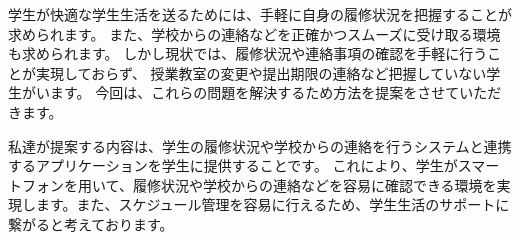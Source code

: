 学生が快適な学生生活を送るためには、手軽に自身の履修状況を把握することが求められます。
また、学校からの連絡などを正確かつスムーズに受け取る環境も求められます。
しかし現状では、履修状況や連絡事項の確認を手軽に行うことが実現しておらず、
授業教室の変更や提出期限の連絡など把握していない学生がいます。
今回は、これらの問題を解決するため方法を提案をさせていただきます。

私達が提案する内容は、学生の履修状況や学校からの連絡を行うシステムと連携するアプリケーションを学生に提供することです。
これにより、学生がスマートフォンを用いて、履修状況や学校からの連絡などを容易に確認できる環境を実現します。また、スケジュール管理を容易に行えるため、学生生活のサポートに繋がると考えております。
